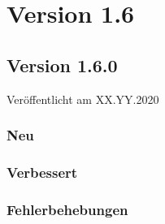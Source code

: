 \section{Version 1.6}\label{version:1:6}
\subsection{Version 1.6.0}
\label{version:1:6:0}
Veröffentlicht am XX.YY.2020
\subsubsection{Neu}
\subsubsection{Verbessert}
\subsubsection{Fehlerbehebungen}
